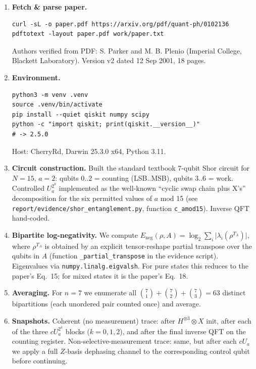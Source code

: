 \documentclass[11pt]{article}
\begin{document}
\begin{enumerate}
\item \textbf{Fetch \& parse paper.}
  \begin{lstlisting}
curl -sL -o paper.pdf https://arxiv.org/pdf/quant-ph/0102136
pdftotext -layout paper.pdf work/paper.txt
  \end{lstlisting}
  Authors verified from PDF: S. Parker and M. B. Plenio (Imperial College,
  Blackett Laboratory). Version v2 dated 12 Sep 2001, 18 pages.

\item \textbf{Environment.}
  \begin{lstlisting}
python3 -m venv .venv
source .venv/bin/activate
pip install --quiet qiskit numpy scipy
python -c "import qiskit; print(qiskit.__version__)"
# -> 2.5.0
  \end{lstlisting}
  Host: CherryRd, Darwin 25.3.0 x64, Python 3.11.

\item \textbf{Circuit construction.}
  Built the standard textbook 7-qubit Shor circuit for $N=15$, $a=2$:
  qubits $0..2$ = counting (LSB..MSB), qubits $3..6$ = work.
  Controlled $U_a^{2^k}$ implemented as the well-known ``cyclic swap
  chain plus X's'' decomposition for the six permitted values of $a$
  mod 15 (see \texttt{report/evidence/shor\_entanglement.py},
  function \texttt{c\_amod15}).  Inverse QFT hand-coded.

\item \textbf{Bipartite log-negativity.}
  We compute
  $E_{\mathrm{neg}}(\rho, A) = \log_2 \sum_i \bigl|\lambda_i(\rho^{T_A})\bigr|$,
  where $\rho^{T_A}$ is obtained by an explicit tensor-reshape partial
  transpose over the qubits in $A$ (function \texttt{\_partial\_transpose}
  in the evidence script).  Eigenvalues via
  \texttt{numpy.linalg.eigvalsh}.  For pure states this reduces to the
  paper's Eq.~15; for mixed states it is the paper's Eq.~18.

\item \textbf{Averaging.}
  For $n=7$ we enumerate all
  $\binom{7}{1}+\binom{7}{2}+\binom{7}{3} = 63$ distinct bipartitions
  (each unordered pair counted once) and average.

\item \textbf{Snapshots.}
  Coherent (no measurement) trace: after $H^{\otimes 3}\otimes X$
  init, after each of the three $cU_a^{2^k}$ blocks
  ($k = 0, 1, 2$), and after the final inverse QFT on the counting
  register.  Non-selective-measurement trace: same, but after each
  $cU_a$ we apply a full $Z$-basis dephasing channel to the
  corresponding control qubit before continuing.


\end{enumerate}
\end{document}
